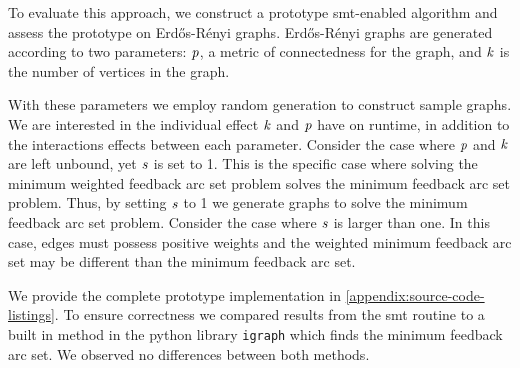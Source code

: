 \label{section:case-studies}
%
To evaluate this approach, we construct a prototype \ac{smt}-enabled algorithm
and assess the prototype on Erd\H{o}s-R\'{e}nyi graphs. Erd\H{o}s-R\'{e}nyi
graphs are generated according to two parameters: $\mathit{p}$, a metric of
connectedness for the graph, and $\mathit{k}$ is the number of vertices in the
graph.

With these parameters we employ random generation to construct sample graphs. We
are interested in the individual effect $\mathit{k}$ and $\mathit{p}$ have on runtime,
in addition to the interactions effects between each parameter. Consider the
case where $\mathit{p}$ and $\mathit{k}$ are left unbound, yet $\mathit{s}$ is set to 1.
This is the specific case where solving the minimum weighted feedback arc set
problem solves the minimum feedback arc set problem. Thus, by setting $\mathit{s}$
to 1 we generate graphs to solve the minimum feedback arc set problem. Consider
the case where $\mathit{s}$ is larger than one. In this case, edges must possess
positive weights and the weighted minimum feedback arc set may be different than
the minimum feedback arc set.

We provide the complete prototype implementation in
\autoref{appendix:source-code-listings}. To ensure correctness we compared
results from the \ac{smt} routine to a built in method in the python library
\lstinline{igraph} which finds the minimum feedback arc set. We observed no
differences between both methods.


